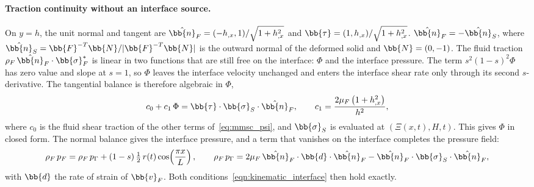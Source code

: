 \paragraph{Traction continuity without an interface source.}
On $y = h$, the unit normal and tangent are $\hat{\bb{n}}_F = (-h_{,x}, 1)/\sqrt{1 + h_{,x}^2}$ and $\bb{\tau} = (1, h_{,x})/\sqrt{1 + h_{,x}^2}$.
$\hat{\bb{n}}_F = -\hat{\bb{n}}_S$, where $\hat{\bb{n}}_S = \bb{F}^{-T}\bb{N}/|\bb{F}^{-T}\bb{N}|$ is the outward normal of the deformed solid and $\bb{N} = (0,-1)$.
The fluid traction $\rho_F\,\hat{\bb{n}}_F\cdot\bb{\sigma}_F^*$ is linear in two functions that are still free on the interface: $\Phi$ and the interface pressure.
The term $s^2(1-s)^2\Phi$ has zero value and slope at $s = 1$, so $\Phi$ leaves the interface velocity unchanged and enters the interface shear rate only through its second $s$-derivative.
The tangential balance is therefore algebraic in $\Phi$,
\begin{equation}
  c_0 + c_1\,\Phi = \bb{\tau}\cdot\bb{\sigma}_S\cdot\hat{\bb{n}}_F,
  \qquad c_1 = \frac{2\mu_F\left(1 + h_{,x}^2\right)}{h^2},
  \label{eq:mmsc_Phi}
\end{equation}
where $c_0$ is the fluid shear traction of the other terms of~\eqref{eq:mmsc_psi}, and $\bb{\sigma}_S$ is evaluated at $(\Xi(x,t), H, t)$.
This gives $\Phi$ in closed form.
The normal balance gives the interface pressure, and a term that vanishes on the interface completes the pressure field:
\begin{equation}
  \rho_F\,p_F = \rho_F\,p_\Gamma + (1 - s)\,\tfrac{1}{2}\,r(t)\cos\!\left(\frac{\pi x}{L}\right), \qquad
  \rho_F\,p_\Gamma = 2\mu_F\,\hat{\bb{n}}_F\cdot\bb{d}\cdot\hat{\bb{n}}_F - \hat{\bb{n}}_F\cdot\bb{\sigma}_S\cdot\hat{\bb{n}}_F,
  \label{eq:mmsc_p}
\end{equation}
with $\bb{d}$ the rate of strain of $\bb{v}_F$.
Both conditions~\eqref{eqn:kinematic_interface} then hold exactly.

